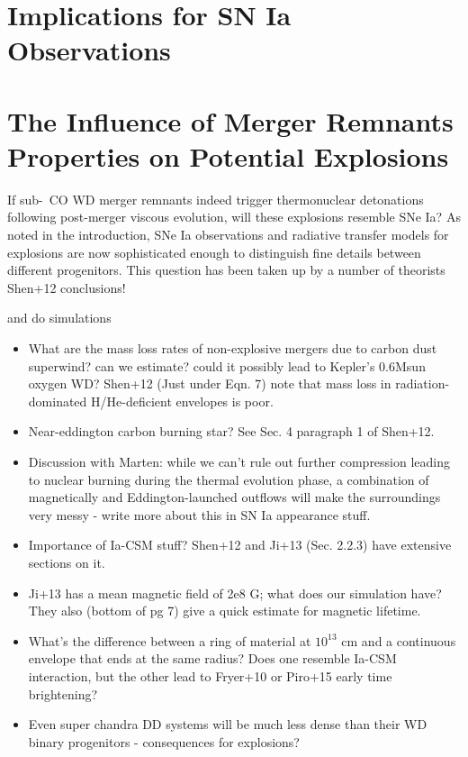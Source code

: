 

\section{Implications for SN Ia Observations}

\section{The Influence of Merger Remnants Properties on Potential Explosions}

If sub-\Mch\ CO WD merger remnants indeed trigger thermonuclear detonations following post-merger viscous evolution, will these explosions resemble SNe Ia?  As noted in the introduction, SNe Ia observations and radiative transfer models for explosions are now sophisticated enough to distinguish fine details between different progenitors.  This question has been taken up by a number of theorists \citep{frye+10, shen+12}  Shen+12 conclusions!

\cite{frye+10} and \cite{rask+14} do simulations

\begin{itemize}
	\item What are the mass loss rates of non-explosive mergers due to carbon dust superwind?  can we estimate?  could it possibly lead to Kepler's 0.6Msun oxygen WD? Shen+12 (Just under Eqn. 7) note that mass loss in radiation-dominated H/He-deficient envelopes is poor. %
	\item Near-eddington carbon burning star?  See Sec. 4 paragraph 1 of Shen+12.
	\item Discussion with Marten: while we can't rule out further compression leading to nuclear burning during the thermal evolution phase, a combination of magnetically and Eddington-launched outflows will make the surroundings very messy - write more about this in SN Ia appearance stuff.
	\item Importance of Ia-CSM stuff?  Shen+12 and Ji+13 (Sec. 2.2.3) have extensive sections on it.
	\item Ji+13 has a mean magnetic field of 2e8 G; what does our simulation have?  They also (bottom of pg 7) give a quick estimate for magnetic lifetime.
	\item What's the difference between a ring of material at $10^{13}$ cm and a continuous envelope that ends at the same radius?  Does one resemble Ia-CSM interaction, but the other lead to Fryer+10 or Piro+15 early time brightening?
	\item Even super chandra DD systems will be much less dense than their WD binary progenitors - consequences for explosions?
\end{itemize}



